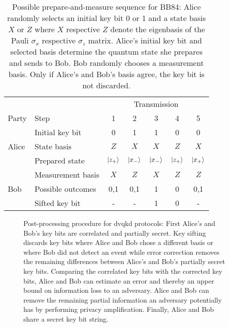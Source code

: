 \begin{table}[htb]
	\centering
	\begin{tabular}{llccccc}
		\toprule
		& & \multicolumn{5}{c}{Transmission} \\
		\cmidrule{3-7}
		Party & Step & 1 & 2 & 3 & 4 & 5 \\ 
		\midrule
		\multirow{3}{*}{Alice} & Initial key bit & \num{0} & \num{1} & \num{1} & \num{0} & \num{0} \\
		& State basis & $Z$ & $X$ & $X$ & $Z$ & $X$ \\
		& Prepared state & $\ket{z_+}$ & $\ket{x_-}$ & $\ket{x_-}$ & $\ket{z_+}$ & $\ket{x_+}$ \\
		\cmidrule{1-1}
		\multirow{3}{*}{Bob} & Measurement basis & $X$ & $Z$ & $X$ & $Z$ & $Z$ \\
		& Possible outcomes & \num{0},\num{1} & \num{0},\num{1} & \num{1} & \num{0} & \num{0},\num{1} \\
		& Sifted key bit & - & - & 1 & 0 & - \\
		\bottomrule
	\end{tabular}
	\caption{Possible prepare-and-measure sequence for BB84: Alice randomly selects an initial key bit \num{0} or \num{1} and a state basis $X$ or $Z$ where $X$ respective $Z$ denote the eigenbasis of the Pauli $\sigma_x$ respective $\sigma_z$ matrix. Alice's initial key bit and selected basis determine the quantum state she prepares and sends to Bob. Bob randomly chooses a measurement basis. Only if Alice's and Bob's basis agree, the key bit is not discarded.}
\end{table}
\begin{figure}[htb]
	\centering
	
	\caption{Post-processing procedure for \gls{dvqkd} protocols: First Alice's and Bob's key bits are correlated and partially secret. Key sifting discards key bits where Alice and Bob chose a different basis or where Bob did not detect an event while error correction removes the remaining differences between Alice's and Bob's partially secret key bits. Comparing the correlated key bits with the corrected key bits, Alice and Bob can estimate an error and thereby an upper bound on information loss to an adversary. Alice and Bob can remove the remaining partial information an adversary potentially has by performing privacy amplification. Finally, Alice and Bob share a secret key bit string.}
\end{figure}
\cite{Duvsek2006} %

